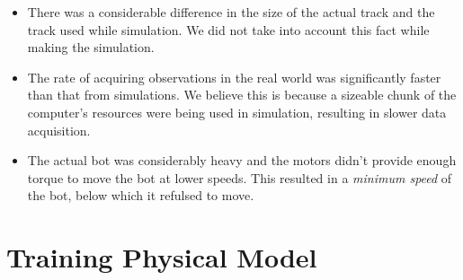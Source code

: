 \documentclass[12pt]{extreport}
\begin{document}
\begin{itemize}
	\item There was a considerable difference in the size of the actual track and the track used while simulation. We did not take into account this fact while making the simulation.
	\item The rate of acquiring observations in the real world was significantly faster than that from simulations. We believe this is because a sizeable chunk of the computer's resources were being used in simulation, resulting in slower data acquisition.
	\item The actual bot was considerably heavy and the motors didn't provide enough torque to move the bot at lower speeds. This resulted in a \emph{minimum speed} of the bot, below which it refulsed to move.
\end{itemize}

\section{Training Physical Model}



\end{document}
